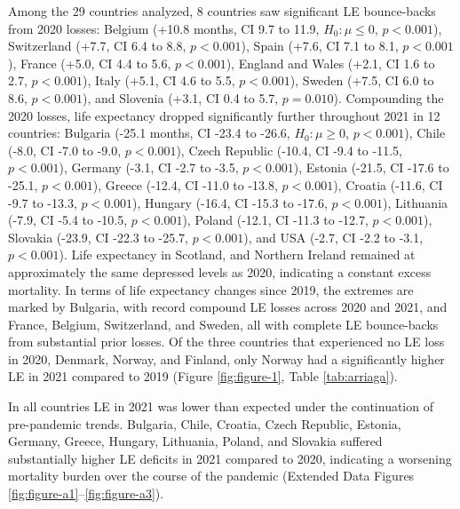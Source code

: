 \documentclass[12pt]{article}
\begin{document}
Among the 29 countries analyzed, 8 countries saw significant LE bounce-backs from 2020 losses:
Belgium (+10.8 months, CI 9.7 to 11.9, $H_0: \mu \leq 0$, $p< 0.001$),
Switzerland (+7.7, CI 6.4 to 8.8, $p< 0.001$),
Spain (+7.6, CI 7.1 to 8.1, $p< 0.001$),
France (+5.0, CI 4.4 to 5.6, $p< 0.001$),
England and Wales (+2.1, CI 1.6 to 2.7, $p< 0.001$),
Italy (+5.1, CI 4.6 to 5.5, $p< 0.001$),
Sweden (+7.5, CI 6.0 to 8.6, $p< 0.001$), and
Slovenia (+3.1, CI 0.4 to 5.7, $p=0.010$).
Compounding the 2020 losses, life expectancy dropped significantly further throughout 2021 in 12 countries:
Bulgaria (-25.1 months, CI -23.4 to -26.6, $H_0: \mu \geq 0$, $p< 0.001$),
Chile (-8.0, CI -7.0 to -9.0, $p< 0.001$),
Czech Republic (-10.4, CI -9.4 to -11.5, $p< 0.001$),
Germany (-3.1, CI -2.7 to -3.5, $p< 0.001$),
Estonia (-21.5, CI -17.6 to -25.1, $p< 0.001$),
Greece (-12.4, CI -11.0 to -13.8, $p< 0.001$),
Croatia (-11.6, CI -9.7 to -13.3, $p< 0.001$),
Hungary (-16.4, CI -15.3 to -17.6, $p< 0.001$),
Lithuania (-7.9, CI -5.4 to -10.5, $p< 0.001$),
Poland (-12.1, CI -11.3 to -12.7, $p< 0.001$),
Slovakia (-23.9, CI -22.3 to -25.7, $p < 0.001$), and
USA (-2.7, CI -2.2 to -3.1, $p< 0.001$).
Life expectancy in Scotland, and Northern Ireland remained at approximately the same depressed levels as 2020, indicating a constant excess mortality.
In terms of life expectancy changes since 2019, the extremes are marked by Bulgaria, with record compound LE losses across 2020 and 2021, and France, Belgium, Switzerland, and Sweden, all with complete LE bounce-backs from substantial prior losses. Of the three countries that experienced no LE loss in 2020, Denmark, Norway, and Finland, only Norway had a significantly higher LE in 2021 compared to 2019 (Figure \ref{fig:figure-1}, Table \ref{tab:arriaga}).

In all countries LE in 2021 was lower than expected under the continuation of pre-pandemic trends. Bulgaria, Chile, Croatia, Czech Republic, Estonia, Germany, Greece, Hungary, Lithuania, Poland, and Slovakia suffered substantially higher LE deficits in 2021 compared to 2020, indicating a worsening mortality burden over the course of the pandemic (Extended Data Figures \ref{fig:figure-a1}--\ref{fig:figure-a3}).
\end{document}
